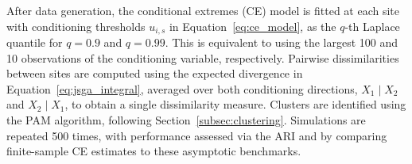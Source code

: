 \documentclass[12pt]{article}
\newcommand{\JSGa}{\mathop{\mathrm{JS}^{\mathrm{G}_{\lambda}}}\nolimits}
\begin{document}
After data generation, the conditional extremes (CE) model is fitted at each site with conditioning thresholds $u_{i, s}$ in Equation~\eqref{eq:ce_model}, as the $q$-th Laplace quantile for \(q=0.9\) and \(q=0.99\).
This is equivalent to using the largest 100 and 10 observations of the conditioning variable, respectively.
Pairwise dissimilarities between sites are computed using the expected divergence in Equation~\eqref{eq:jsga_integral}, averaged over both conditioning directions, \(X_1 \mid X_2\) and \(X_2 \mid X_1\), to obtain a single dissimilarity measure.
Clusters are identified using the PAM algorithm, following Section~\ref{subsec:clustering}. 
Simulations are repeated 500 times, with performance assessed via the ARI and by comparing finite-sample CE estimates to these asymptotic benchmarks. 
\end{document}
